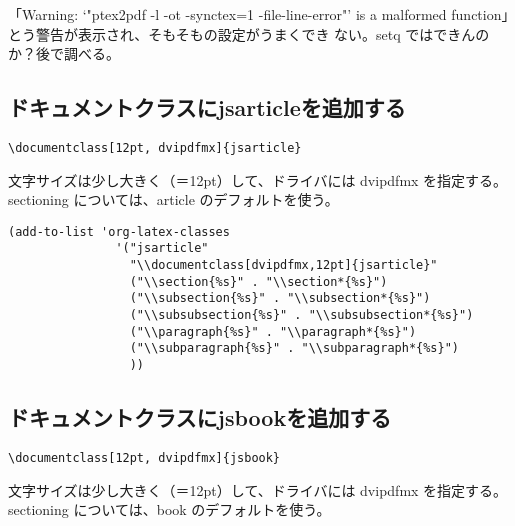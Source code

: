 \documentclass[dvipdfmx,12pt]{jsarticle}
\begin{document}
「Warning: `"ptex2pdf -l -ot -synctex=1 -file-line-error"' is a
malformed function」とう警告が表示され、そもそもの設定がうまくでき
ない。setq ではできんのか？後で調べる。


\subsection{ドキュメントクラスにjsarticleを追加する}
\label{sec-4-3}

\lstset{language=[LaTeX]TeX,label= ,caption= ,numbers=none}
\begin{lstlisting}
\documentclass[12pt, dvipdfmx]{jsarticle}
\end{lstlisting}

文字サイズは少し大きく（＝12pt）して、ドライバには dvipdfmx を指定する。
sectioning については、article のデフォルトを使う。

\lstset{language=Lisp,label= ,caption= ,numbers=none}
\begin{lstlisting}
(add-to-list 'org-latex-classes
               '("jsarticle"
                 "\\documentclass[dvipdfmx,12pt]{jsarticle}"
                 ("\\section{%s}" . "\\section*{%s}")
                 ("\\subsection{%s}" . "\\subsection*{%s}")
                 ("\\subsubsection{%s}" . "\\subsubsection*{%s}")
                 ("\\paragraph{%s}" . "\\paragraph*{%s}")
                 ("\\subparagraph{%s}" . "\\subparagraph*{%s}")
                 ))
\end{lstlisting}

\subsection{ドキュメントクラスにjsbookを追加する}
\label{sec-4-4}

\lstset{language=[LaTeX]TeX,label= ,caption= ,numbers=none}
\begin{lstlisting}
\documentclass[12pt, dvipdfmx]{jsbook}
\end{lstlisting}

文字サイズは少し大きく（＝12pt）して、ドライバには dvipdfmx を指定する。
sectioning については、book のデフォルトを使う。
\end{document}
